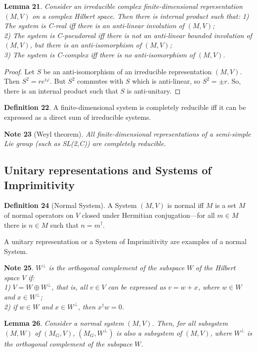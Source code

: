 \documentclass[11pt]{book}
\begin{document}
\textbf{Lemma 21}. \emph{Consider an irreducible complex
finite-dimensional representation }\((M,V)\)\emph{ on a complex Hilbert
space. Then there is internal product such that: 1) The system is C-real
iff there is an anti-linear involution of }\((M,V)\)\emph{;}\\
\emph{2) The system is C-pseudoreal iff there is not an anti-linear
bounded involution of }\((M,V)\)\emph{, but there is an anti-isomorphism
of }\((M,V)\)\emph{;}\\
\emph{3) The system is C-complex iff there is no anti-isomorphism of
}\((M,V)\)\emph{.}

\emph{Proof.} Let \(S\) be an anti-isomorphism of an irreducible
representation \((M,V)\). Then \(S^2=re^{i\varphi}\). But \(S^2\)
commutes with \(S\) which is anti-linear, so \(S^2=\pm r\). So, there is
an internal product such that \(S\) is anti-unitary.~◻

\textbf{Definition 22}. A finite-dimensional system is completely
reducible iff it can be expressed as a direct sum of irreducible
systems.

\textbf{Note 23} (Weyl theorem). \emph{All finite-dimensional
representations of a semi-simple Lie group (such as SL(2,C)) are
completely reducible.}

\hypertarget{section:Unitary}{%
\subsection{Unitary representations and Systems of
Imprimitivity}\label{section:Unitary}}

\textbf{Definition 24} (Normal System). A System \((M,V)\) is normal iff
\(M\) is a set \(M\) of normal operators on \(V\) closed under Hermitian
conjugation---for all \(m\in M\) there is \(n\in M\) such that
\(n=m^\dagger\).

A unitary representation or a System of Imprimitivity are examples of a
normal System.

\textbf{Note 25}. \(W^\bot\)\emph{ is the orthogonal complement of the
subspace }\(W\)\emph{ of the Hilbert space }\(V\)\emph{ if:}\\
\emph{1) }\(V=W \oplus W^\bot\)\emph{, that is, all }\(v\in V\)\emph{
can be expressed as }\(v=w+x\)\emph{, where }\(w\in W\)\emph{ and
}\(x\in W^\bot\)\emph{;}\\
\emph{2) if }\(w\in W\)\emph{ and }\(x\in W^\bot\)\emph{, then
}\(x^\dagger w=0\)\emph{.}

\textbf{Lemma 26}. \emph{Consider a normal system }\((M,V)\)\emph{.
Then, for all subsystem }\((M,W)\)\emph{ of }\((M_G,V)\)\emph{,
}\((M_G,W^\bot)\)\emph{ is also a subsystem of }\((M,V)\)\emph{, where
}\(W^\bot\)\emph{ is the orthogonal complement of the subspace
}\(W\)\emph{.}
\end{document}

